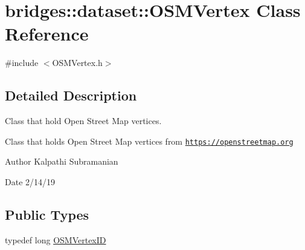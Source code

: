 \hypertarget{classbridges_1_1dataset_1_1_o_s_m_vertex}{}\section{bridges\+:\+:dataset\+:\+:O\+S\+M\+Vertex Class Reference}
\label{classbridges_1_1dataset_1_1_o_s_m_vertex}


{\ttfamily \#include $<$O\+S\+M\+Vertex.\+h$>$}



\subsection{Detailed Description}
Class that hold Open Street Map vertices. 

Class that holds Open Street Map vertices from \href{https://openstreetmap.org}{\tt https\+://openstreetmap.\+org}

\begin{DoxyAuthor}{Author}
Kalpathi Subramanian 
\end{DoxyAuthor}
\begin{DoxyDate}{Date}
2/14/19 
\end{DoxyDate}
\subsection*{Public Types}
\begin{DoxyCompactItemize}
\item 
typedef long \hyperlink{classbridges_1_1dataset_1_1_o_s_m_vertex_ad166f13b0aefbdc05a273546f2a3bb96}{O\+S\+M\+Vertex\+ID}
\end{DoxyCompactItemize}
